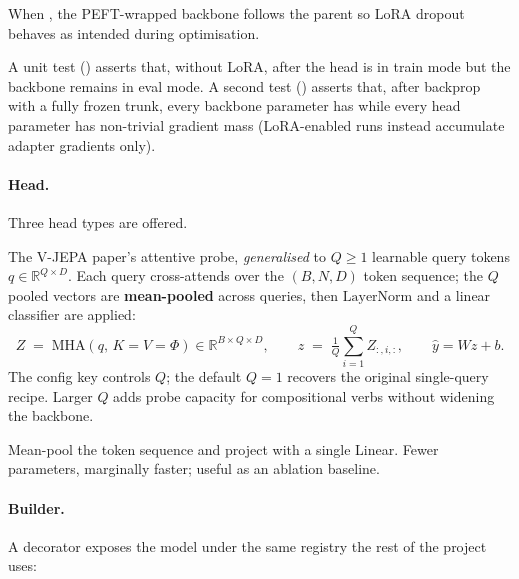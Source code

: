 When , the PEFT-wrapped backbone follows the
parent  so LoRA dropout behaves as intended during
optimisation.

A unit test ()
asserts that, without LoRA, after  the head is in
train mode but the backbone remains in eval mode. A second test
()
asserts that, after backprop with a fully frozen trunk, every backbone
parameter has  while every head parameter has
non-trivial gradient mass (LoRA-enabled runs instead accumulate adapter
gradients only).

\paragraph{Head.} Three head types are offered.
\begin{description}[leftmargin=1.5em, style=nextline]
\item[\code{attentive} (default).]
   The V-JEPA paper's attentive probe, \emph{generalised} to \(Q\ge 1\)
   learnable query tokens \(q \in \mathbb{R}^{Q\times D}\). Each query
   cross-attends over the \((B, N, D)\) token sequence; the \(Q\) pooled
   vectors are \textbf{mean-pooled} across queries, then
   \(\mathrm{LayerNorm}\) and a linear classifier are applied:
   \[
   Z \;=\; \mathrm{MHA}(q,\, K{=}V{=}\Phi)\in\mathbb{R}^{B\times Q\times D},
   \qquad
   z \;=\; \tfrac{1}{Q}\sum_{i=1}^{Q} Z_{:,i,:},
   \qquad
   \widehat{y} = Wz + b.
   \]
   The config key  controls \(Q\); the default
   \(Q{=}1\) recovers the original single-query recipe. Larger \(Q\) adds
   probe capacity for compositional verbs without widening the backbone.
\item[\code{linear} / \code{mean\_linear}.]
   Mean-pool the token sequence and project with a single Linear.
   Fewer parameters, marginally faster; useful as an ablation baseline.
\end{description}

\paragraph{Builder.} A  decorator
exposes the model under the same registry the rest of the project uses:

